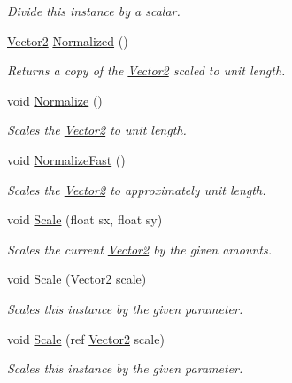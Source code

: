 \begin{DoxyCompactItemize}
\begin{DoxyCompactList}\small\item\em Divide this instance by a scalar.\end{DoxyCompactList}\item 
\hyperlink{struct_open_t_k_1_1_vector2}{Vector2} \hyperlink{struct_open_t_k_1_1_vector2_a185f15da996c575c32fe25f22d449aa3}{Normalized} ()
\begin{DoxyCompactList}\small\item\em Returns a copy of the \hyperlink{struct_open_t_k_1_1_vector2}{Vector2} scaled to unit length. \end{DoxyCompactList}\item 
void \hyperlink{struct_open_t_k_1_1_vector2_a082798f10a777043a9b7e18db96ea1d0}{Normalize} ()
\begin{DoxyCompactList}\small\item\em Scales the \hyperlink{struct_open_t_k_1_1_vector2}{Vector2} to unit length. \end{DoxyCompactList}\item 
void \hyperlink{struct_open_t_k_1_1_vector2_ae17139e85700673c4ac343b093683f0a}{Normalize\-Fast} ()
\begin{DoxyCompactList}\small\item\em Scales the \hyperlink{struct_open_t_k_1_1_vector2}{Vector2} to approximately unit length. \end{DoxyCompactList}\item 
void \hyperlink{struct_open_t_k_1_1_vector2_ac9012e6cf3cbc4a9a4c99cf7d9e00336}{Scale} (float sx, float sy)
\begin{DoxyCompactList}\small\item\em Scales the current \hyperlink{struct_open_t_k_1_1_vector2}{Vector2} by the given amounts. \end{DoxyCompactList}\item 
void \hyperlink{struct_open_t_k_1_1_vector2_abd5fd854bcf3b8b49eade5eb838bcdae}{Scale} (\hyperlink{struct_open_t_k_1_1_vector2}{Vector2} scale)
\begin{DoxyCompactList}\small\item\em Scales this instance by the given parameter.\end{DoxyCompactList}\item 
void \hyperlink{struct_open_t_k_1_1_vector2_ac8273523a19507d191cc5f45ae7f9d5e}{Scale} (ref \hyperlink{struct_open_t_k_1_1_vector2}{Vector2} scale)
\begin{DoxyCompactList}\small\item\em Scales this instance by the given parameter.\end{DoxyCompactList}\item 

\end{DoxyCompactItemize}
